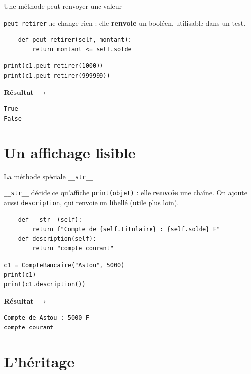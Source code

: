 \documentclass[aspectratio=169,11pt]{beamer}
\newcommand{\resultat}{{\scriptsize\textbf{R\'esultat}~$\rightarrow$}\par\vspace{1pt}}
\begin{document}
\begin{frame}[fragile]{Une méthode peut renvoyer une valeur}
\begin{ucadex}
{\small \texttt{peut\_retirer} ne change rien : elle \textbf{renvoie} un booléen, utilisable dans un test.}
\end{ucadex}
\begin{lstlisting}
    def peut_retirer(self, montant):
        return montant <= self.solde
\end{lstlisting}
\begin{lstlisting}
print(c1.peut_retirer(1000))
print(c1.peut_retirer(999999))
\end{lstlisting}
\resultat
\begin{lstlisting}[style=out]
True
False
\end{lstlisting}
\end{frame}

\section{Un affichage lisible}

\begin{frame}[fragile]{La méthode spéciale \texttt{\_\_str\_\_}}
\begin{ucaddef}
{\small \texttt{\_\_str\_\_} décide ce qu'affiche \texttt{print(objet)} : elle \textbf{renvoie} une chaîne. On ajoute aussi \texttt{description}, qui renvoie un libellé (utile plus loin).}
\end{ucaddef}
\begin{lstlisting}
    def __str__(self):
        return f"Compte de {self.titulaire} : {self.solde} F"
    def description(self):
        return "compte courant"
\end{lstlisting}
\begin{lstlisting}
c1 = CompteBancaire("Astou", 5000)
print(c1)
print(c1.description())
\end{lstlisting}
\resultat
\begin{lstlisting}[style=out]
Compte de Astou : 5000 F
compte courant
\end{lstlisting}
\end{frame}

\section{L'héritage}
\end{document}
